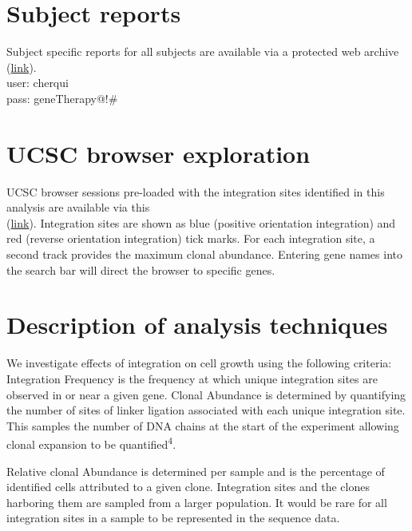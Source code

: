 \documentclass[12pt,]{article}
\begin{document}
\vspace{0.5cm}

\section{Subject reports}\label{subject-reports}

Subject specific reports for all subjects are available via a protected
web archive
(\href{http://www.bushmanlab.org/data/export/cherqui}{link}).\\
user: cherqui\\
pass: geneTherapy@!\#

\vspace{0.5cm}

\section{UCSC browser exploration}\label{ucsc-browser-exploration}

UCSC browser sessions pre-loaded with the integration sites identified
in this analysis are available via this\\
(\href{http://genome.ucsc.edu/cgi-bin/hgTracks?org=mouse\&db=mm9\&hgt.customText=http://microb120.med.upenn.edu/UCSC/cherqui/UCSC_CYS_mouse.group2.ucsc}{link}).
Integration sites are shown as blue (positive orientation integration)
and red (reverse orientation integration) tick marks. For each
integration site, a second track provides the maximum clonal abundance.
Entering gene names into the search bar will direct the browser to
specific genes.

\newpage

\section{Description of analysis
techniques}\label{description-of-analysis-techniques}

We investigate effects of integration on cell growth using the following
criteria: Integration Frequency is the frequency at which unique
integration sites are observed in or near a given gene. Clonal Abundance
is determined by quantifying the number of sites of linker ligation
associated with each unique integration site. This samples the number of
DNA chains at the start of the experiment allowing clonal expansion to
be quantified\textsuperscript{4}.

Relative clonal Abundance is determined per sample and is the percentage
of identified cells attributed to a given clone. Integration sites and
the clones harboring them are sampled from a larger population. It would
be rare for all integration sites in a sample to be represented in the
sequence data.
\end{document}
